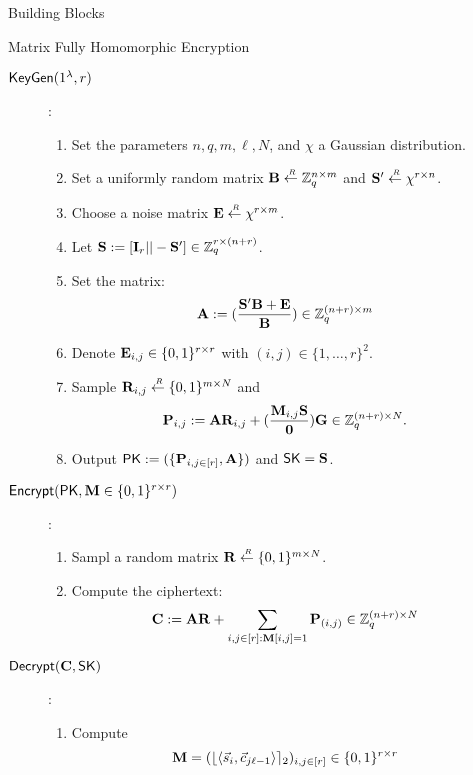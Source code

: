\begin{section}{Building Blocks}
  \begin{subsection}{Matrix Fully Homomorphic Encryption~\cite{DBLP:conf/pkc/HiromasaAO15}}
    \begin{description}
    \item[${\mathsf{KeyGen}} (1^\lambda, r)$]:
      \begin{enumerate}
      \item Set the parameters $n, q, m, \ell, N$, and $\chi$ a Gaussian distribution.
      \item Set a uniformly random matrix $\mathbf{B} \stackrel{{\scriptscriptstyle \mkern4mu R}}{\gets} \mathbb{Z}_q^{n \times m}$ and $\mathbf{S'} \stackrel{{\scriptscriptstyle \mkern4mu R}}{\gets} \chi^{r \times n}$.
      \item Choose a noise matrix $\mathbf{E} \stackrel{{\scriptscriptstyle \mkern4mu R}}{\gets} \chi^{r \times m}$.
      \item Let $\mathbf{S}:= [\mathbf{I}_r || - \mathbf{S}'] \in \mathbb{Z}_q^{r \times (n+r)}$.
      \item Set the matrix:
        \begin{align*}
          \mathbf{A} &:= (\frac{\mathbf{S}'\mathbf{B} + \mathbf{E}}{\mathbf{B}}) \in \mathbb{Z}_q^{(n+r) \times m}
        \end{align*}
      \item Denote $\mathbf{E}_{i,j} \in \{0, 1\}^{r\times r}$ with $(i,j) \in \{1, \dots ,r\}^2$.
      \item Sample $\mathbf{R}_{i,j} \stackrel{{\scriptscriptstyle \mkern4mu R}}{\gets} \{0,1\}^{m \times N}$ and 
        \begin{align*}
          \mathbf{P}_{i,j} &:= \mathbf{A} \mathbf{R}_{i,j} + (\frac{\mathbf{M}_{i,j}\mathbf{S}}{\mathbf{0}}) \mathbf{G} \in \mathbb{Z}_q^{(n+r) \times N}.
        \end{align*}
      \item Output $\mathsf{PK} := (\{\mathbf{P}_{i,j \in [r]}, \mathbf{A}\})$ and $\mathsf{SK} = \mathbf{S}$.
      \end{enumerate}

    \item[${\mathsf{Encrypt}}(\mathsf{PK}, \mathbf{M} \in \{0,1\}^{r \times r})$] :
      \begin{enumerate}
      \item Sampl a random matrix $\mathbf{R} \stackrel{{\scriptscriptstyle \mkern4mu R}}{\gets} \{0,1\}^{m \times N}$.
      \item Compute the ciphertext:
        \begin{align*}
          \mathbf{C} &:= \mathbf{A} \mathbf{R} + \sum_{i,j \in [r] : \mathbf{M}[i,j] = 1} \mathbf{P}_{(i,j)} \in \mathbb{Z}_q^{(n+r) \times N}
        \end{align*}
      \end{enumerate}

    \item[${\mathsf{Decrypt}}(\mathbf{C}, \mathsf{SK})$]:
      \begin{enumerate}
      \item Compute
        \begin{align*}
          \mathbf{M} &=(\lfloor\langle \vec{s}_i, \vec{c}_{j\ell-1} \rangle\rceil_2)_{i,j \in [r]} \in \{0,1\}^{r \times r}
        \end{align*}
      \end{enumerate}
    \end{description}
  \end{subsection}
\end{section}  

